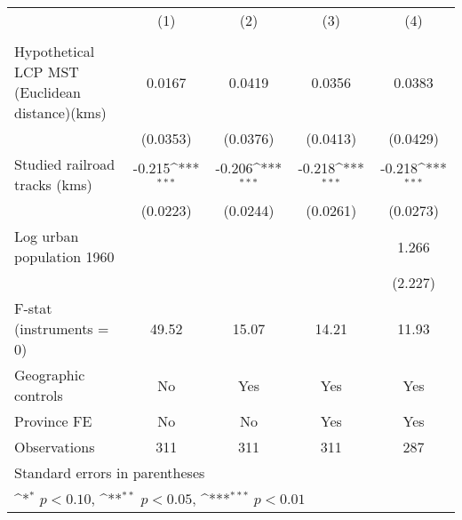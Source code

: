 {
\def\sym#1{\ifmmode^{#1}\else\(^{#1}\)\fi}
\begin{tabular}{l*{4}{c}}
\hline\hline
                &\multicolumn{1}{c}{(1)}&\multicolumn{1}{c}{(2)}&\multicolumn{1}{c}{(3)}&\multicolumn{1}{c}{(4)}\\
                &\multicolumn{1}{c}{}&\multicolumn{1}{c}{}&\multicolumn{1}{c}{}&\multicolumn{1}{c}{}\\
\hline
Hypothetical LCP MST (Euclidean distance)(kms)&   0.0167         &   0.0419         &   0.0356         &   0.0383         \\
                & (0.0353)         & (0.0376)         & (0.0413)         & (0.0429)         \\
[1em]
Studied railroad tracks (kms)&   -0.215\sym{***}&   -0.206\sym{***}&   -0.218\sym{***}&   -0.218\sym{***}\\
                & (0.0223)         & (0.0244)         & (0.0261)         & (0.0273)         \\
[1em]
Log urban population 1960&                  &                  &                  &    1.266         \\
                &                  &                  &                  &  (2.227)         \\
\hline
F-stat (instruments = 0)&    49.52         &    15.07         &    14.21         &    11.93         \\
Geographic controls&       No         &      Yes         &      Yes         &      Yes         \\
Province FE     &       No         &       No         &      Yes         &      Yes         \\
Observations    &      311         &      311         &      311         &      287         \\
\hline\hline
\multicolumn{5}{l}{\footnotesize Standard errors in parentheses}\\
\multicolumn{5}{l}{\footnotesize \sym{*} \(p<0.10\), \sym{**} \(p<0.05\), \sym{***} \(p<0.01\)}\\
\end{tabular}
}
